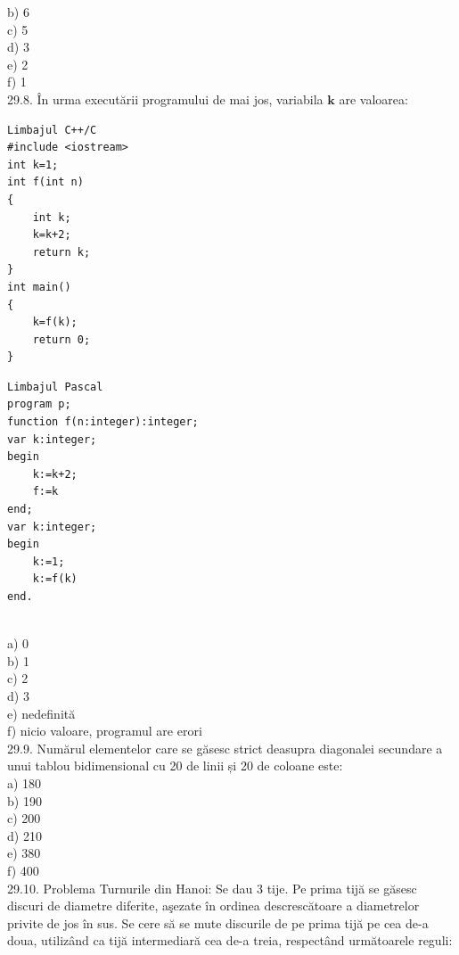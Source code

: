 b) 6
\\
c) 5
\\
d) 3
\\
e) 2
\\
f) 1
\\
29.8. În urma executării programului de mai jos, variabila $\mathbf{k}$ are valoarea:
\begin{verbatim}
Limbajul C++/C
#include <iostream>
int k=1;
int f(int n)
{
    int k;
    k=k+2;
    return k;
}
int main()
{
    k=f(k);
    return 0;
}
\end{verbatim}
\begin{verbatim}
Limbajul Pascal
program p;
function f(n:integer):integer;
var k:integer;
begin
    k:=k+2;
    f:=k
end;
var k:integer;
begin
    k:=1;
    k:=f(k)
end.
\end{verbatim}
\\
a) 0
\\
b) 1
\\
c) 2
\\
d) 3
\\
e) nedefinită
\\
f) nicio valoare, programul are erori
\\
29.9. Numărul elementelor care se găsesc strict deasupra diagonalei secundare a unui tablou bidimensional cu 20 de linii și 20 de coloane este:
\\
a) 180
\\
b) 190
\\
c) 200
\\
d) 210
\\
e) 380
\\
f) 400
\\
29.10. Problema Turnurile din Hanoi: Se dau 3 tije. Pe prima tijă se găsesc discuri de diametre diferite, aşezate în ordinea descrescătoare a diametrelor privite de jos în sus. Se cere să se mute discurile de pe prima tijă pe cea de-a doua, utilizând ca tijă intermediară cea de-a treia, respectând următoarele reguli:
